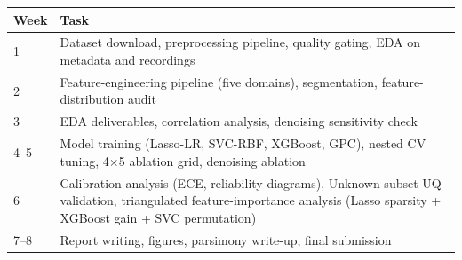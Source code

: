 \documentclass[10pt,twocolumn]{article}
\begin{document}
\begin{table}[H]
\centering
\small
\begin{tabular}{p{1.4cm}p{5.5cm}}
\toprule
\textbf{Week} & \textbf{Task} \\
\midrule
1 & Dataset download, preprocessing pipeline, quality gating, EDA on metadata and recordings \\
2 & Feature-engineering pipeline (five domains), segmentation, feature-distribution audit \\
3 & EDA deliverables, correlation analysis, denoising sensitivity check \\
4--5 & Model training (Lasso-LR, SVC-RBF, XGBoost, GPC), nested CV tuning, 4$\times$5 ablation grid, denoising ablation \\
6 & Calibration analysis (ECE, reliability diagrams), Unknown-subset UQ validation, triangulated feature-importance analysis (Lasso sparsity + XGBoost gain + SVC permutation) \\
7--8 & Report writing, figures, parsimony write-up, final submission \\
\bottomrule
\end{tabular}
\end{table}




\end{document}
